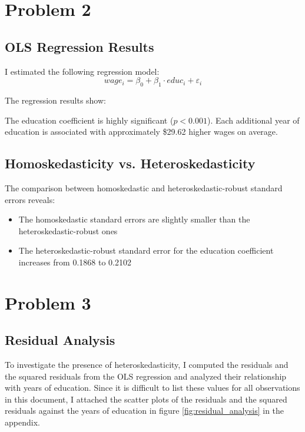 \documentclass[12pt]{article}
\begin{document}
\section{Problem 2}

\subsection{OLS Regression Results}

I estimated the following regression model:
$$wage_i = \beta_0 + \beta_1 \cdot educ_i + \varepsilon_i$$

The regression results show:



The education coefficient is highly significant ($p < 0.001$). Each additional year of education is associated with approximately \$29.62 higher wages on average.

\subsection{Homoskedasticity vs. Heteroskedasticity}

The comparison between homoskedastic and heteroskedastic-robust standard errors reveals:

\begin{itemize}
    \item The homoskedastic standard errors are slightly smaller than the heteroskedastic-robust ones
    \item The heteroskedastic-robust standard error for the education coefficient increases from 0.1868 to 0.2102
\end{itemize}

\section{Problem 3}

\subsection{Residual Analysis}

To investigate the presence of heteroskedasticity, I computed the residuals and the squared residuals from the OLS regression and analyzed their relationship with years of education.
Since it is difficult to list these values for all observations in this document, I attached the scatter plots of the residuals and the squared residuals against the years of education in figure \ref{fig:residual_analysis} in the appendix.
\end{document}
